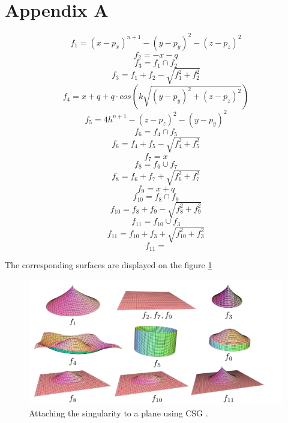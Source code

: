 \chapter*{Appendix A}
\label{appA}

$$f_1 = (x - p_x)^{n+1} - (y - p_y)^2 - (z - p_z)^2$$
$$f_2 = - x - q$$
$$f_3 = f_1 \cap f_2$$
$$f_3 = f_1+f_2-\sqrt{f_1^2+f_2^2}$$
$$f_4 = x + q + q \cdot cos\left(k \sqrt{(y - p_y)^2 + (z - p_z)^2}\right)$$
$$f_5 = 4 h^{n+1} - (z - p_z)^2 - (y - p_y)^2$$
$$f_6 = f_4 \cap f_5$$
$$f_6 = f_4+f_5-\sqrt{f_4^2+f_5^2}$$
$$f_7 = x$$
$$f_8 = f_6 \cup f_7$$
$$f_8 = f_6 + f_7 + \sqrt{f_6^2+f_7^2}$$
$$f_9 = x+q$$
$$f_{10} = f_8 \cap f_9$$
$$f_{10} = f_8 + f_9 - \sqrt{f_8^2+f_9^2}$$
$$f_{11} = f_{10} \cup f_3$$
$$f_{11} = f_{10} + f_3 + \sqrt{f_{10}^2+f_3^2}$$
$$f_{11} = $$

The corresponding surfaces are displayed on the figure \ref{img:27}
\begin{figure}
    \centerline{\includegraphics[scale=0.5]{images/img27}}
    \caption[Attaching the singularity to a plane using CSG]
    {Attaching the singularity to a plane using CSG \cite{calcplot3d}.}
    \label{img:27}
\end{figure}

